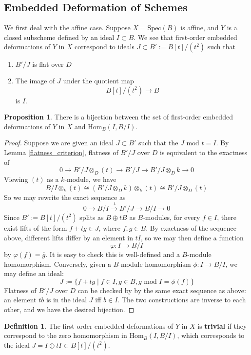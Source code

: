 \documentclass{article}
\newcommand{\Spec}{\textrm{Spec}}
\theoremstyle{definition}
\theoremstyle{definition}
\newtheorem{definition}{Definition}[theorem]
\theoremstyle{definition}
\theoremstyle{definition}
\newtheorem{proposition}{Proposition}[theorem]
\theoremstyle{definition}
\theoremstyle{definition}
\theoremstyle{definition}
\begin{document}
\subsection{Embedded Deformation of Schemes}
We first deal with the affine case. Suppose $X=\Spec(B)$ is affine, and $Y$ is a closed subscheme defined by an ideal $I\subset B$. We see that first-order embedded deformations of $Y$ in $X$ correspond to ideals $J\subset B':= B[t]/(t^2)$ such that 
\begin{enumerate}
	\item $B'/J$ is flat over $D$
	\item The image of $J$ under the quotient map
	\[B[t]/(t^2)\to B\]
	is $I$.
\end{enumerate}
\begin{proposition}
\label{affine_deformation}
	There is a bijection between the set of first-order embedded deformations of $Y$ in $X$ and $\mathrm{Hom}_B (I, B/I)$.
\end{proposition}
\begin{proof}


	Suppose we are given an ideal $J\subset B'$ such that the $J \textrm{ mod } t =I$. By Lemma \ref{flatness_criterion}, flatness of $B'/J$ over $D$ is equivalent to the exactness of
	\[ 0\to B'/J\otimes_D (t)\to B'/J\to B'/J\otimes_D k\to 0\]
	Viewing $(t)$ as a $k$-module, we have 
	\[B/I\otimes_k (t)\cong (B'/J\otimes_D k)\otimes_k (t)\cong  B'/J\otimes_D (t)\]
	So we may rewrite the exact sequence as
	\[0\to B/I\xrightarrow{\cdot t} B'/J\to B/I\to 0\]
	Since $B':=B[t]/(t^2)$ splits as $B\oplus tB$ as $B$-modules, for every $f\in I$, there exist lifts of the form $f+tg\in J$, where $f,g\in B$. By exactness of the sequence above, different lifts differ by an element in $tI$, so we may then define a function
	\[\varphi: I\to B/I\]
	by $\varphi(f)=\overline{g}$. It is easy to check this is well-defined and a $B$-module homomorphism. Conversely, given a $B$-module homomorphism $\phi: I\to B/I$, we may define an ideal:
	\[J:= \{f+t g\mid f\in I, g\in B, g\textrm{ mod } I = \phi(f)\}\]
	Flatness of $B'/J$  over $D$ can be checked by by the same exact sequence as above: an element $tb$ is in the ideal $J$ iff $b\in I$. The two constructions are inverse to each other, and we have the desired bijection.

\end{proof}

\begin{definition}
	The first order embedded deformations of $Y$ in $X$ is \textbf{trivial} if they correspond to the zero homomorphism in $\mathrm{Hom}_B (I, B/I)$, which corresponds to the ideal $J=I\oplus tI\subset B[t]/(t^2)$.
\end{definition}
\end{document}
